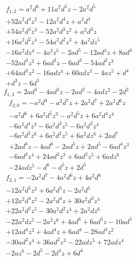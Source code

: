 \documentclass[11pt,a4paper]{article}
\numberwithin{equation}{section}
\theoremstyle{plain}
\theoremstyle{definition}
\theoremstyle{remark}
\begin{document}
\begin{equation}\begin{aligned}&f_{1,2}=a^{2} d^{6} + 11 a^{2} d^{5} z - 2 a^{2} d^{5} \\&+ 52 a^{2} d^{4} z^{2} - 12 a^{2} d^{4} z + a^{2} d^{4} \\&+ 54 a^{2} d^{3} z^{3} - 52 a^{2} d^{3} z^{2} + a^{2} d^{3} z \\&+ 16 a^{2} d^{2} z^{4} - 54 a^{2} d^{2} z^{3} + 4 a^{2} d z^{5} \\&- 16 a^{2} d z^{4} - 4 a^{2} z^{5} - 2 a d^{5} - 12 a d^{4} z + 8 a d^{4} \\&- 52 a d^{3} z^{2} + 6 a d^{3} z - 6 a d^{3} - 54 a d^{2} z^{3} \\&+ 64 a d^{2} z^{2} - 16 a d z^{4} + 60 a d z^{3} - 4 a z^{5} + d^{4} \\&+ d^{3} z - 6 d^{3}\end{aligned}\end{equation}
\begin{equation}f_{1,3}=2 a d^{3} - 4 a d^{2} z - 2 a d^{2} - 4 a d z^{2} - 2 d^{2}\end{equation}
\begin{equation}\begin{aligned}&f_{2,0}=- a^{2} d^{8} - a^{2} d^{7} z + 2 a^{2} d^{7} + 2 a^{2} d^{6} z \\&- a^{2} d^{6} + 6 a^{2} d^{5} z^{3} - a^{2} d^{5} z + 6 a^{2} d^{4} z^{4} \\&- 6 a^{2} d^{4} z^{3} - 6 a^{2} d^{3} z^{5} - 6 a^{2} d^{3} z^{4} \\&- 6 a^{2} d^{2} z^{6} + 6 a^{2} d^{2} z^{5} + 6 a^{2} d z^{6} + 2 a d^{7} \\&+ 2 a d^{6} z - 4 a d^{6} - 2 a d^{5} z + 2 a d^{5} - 6 a d^{4} z^{3} \\&- 6 a d^{3} z^{4} + 24 a d^{3} z^{3} + 6 a d^{2} z^{5} + 6 a d z^{6} \\&- 24 a d z^{5} - d^{6} - d^{5} z + 2 d^{5}\end{aligned}\end{equation}
\begin{equation}\begin{aligned}&f_{2,1}=- 2 a^{2} d^{7} - 4 a^{2} d^{6} z + 4 a^{2} d^{6} \\&- 12 a^{2} d^{5} z^{2} + 6 a^{2} d^{5} z - 2 a^{2} d^{5} \\&+ 12 a^{2} d^{4} z^{2} - 2 a^{2} d^{4} z + 30 a^{2} d^{3} z^{4} \\&+ 22 a^{2} d^{2} z^{5} - 30 a^{2} d^{2} z^{4} + 2 a^{2} d z^{6} \\&- 22 a^{2} d z^{5} - 2 a^{2} z^{6} + 4 a d^{6} + 6 a d^{5} z - 10 a d^{5} \\&+ 12 a d^{4} z^{2} + 4 a d^{4} z + 6 a d^{4} - 28 a d^{3} z^{2} \\&- 30 a d^{2} z^{4} + 36 a d^{2} z^{3} - 22 a d z^{5} + 72 a d z^{4} \\&- 2 a z^{6} - 2 d^{5} - 2 d^{4} z + 6 d^{4}\end{aligned}\end{equation}
\end{document}
